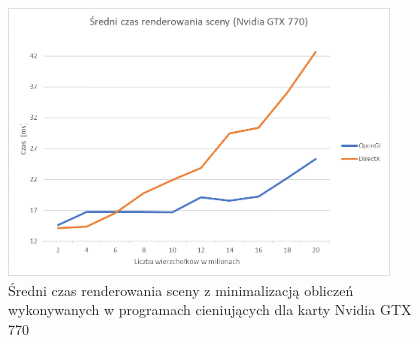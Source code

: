 \documentclass[archive]{mgr}
\begin{document}
\begin{figure}[h!]
  \centering
    \includegraphics[width=0.9\textwidth]{images/shaderoff/1.png}
   \caption{Średni czas renderowania sceny z minimalizacją obliczeń wykonywanych w programach cieniujących dla karty Nvidia GTX 770}
   \label{lab:31}
\end{figure}
\newpage
\end{document}
